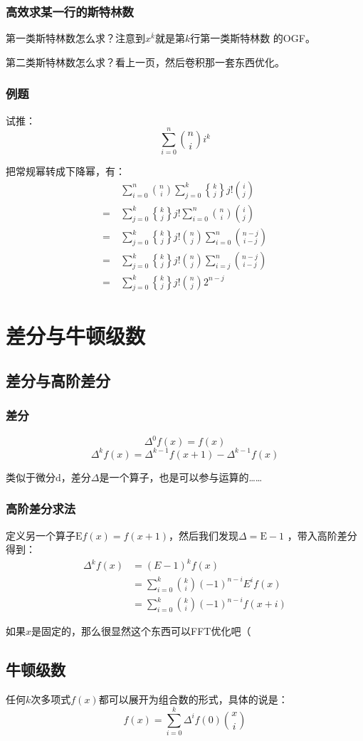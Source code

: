 \subsubsection{高效求某一行的斯特林数}
第一类斯特林数怎么求？注意到$x^{\overline k}$就是第$k$行第一类斯特林数
的OGF。\par
第二类斯特林数怎么求？看上一页，然后卷积那一套东西优化。
\subsubsection{例题}
试推：
\[\sum_{i = 0}^n\binom n i i^k\]\par
把常规幂转成下降幂，有：
\[
\begin{aligned}
\quad&\sum_{i = 0}^n\binom n i\sum_{j = 0}^k{k\brace j}j!\binom i j\\
=&\sum_{j = 0}^k{k\brace j}j!\sum_{i = 0}^n\binom n i\binom i j\\
=&\sum_{j = 0}^k{k\brace j}j!\binom n j\sum_{i = 0}^n\binom{n - j}{i - j}\\
=&\sum_{j = 0}^k{k\brace j}j!\binom n j\sum_{i = j}^n\binom{n - j}{i - j}\\
=&\sum_{j = 0}^k{k\brace j}j!\binom n j2^{n - j}
\end{aligned}
\]
\section{差分与牛顿级数}
\subsection{差分与高阶差分}
\subsubsection{差分}
\[\Delta^0f(x) = f(x)\]
\[\Delta^kf(x) = \Delta^{k - 1}f(x + 1) - \Delta^{k - 1}f(x)\]\par
类似于微分$\mathrm d$，差分$\Delta$是一个算子，也是可以参与运算的……
\subsubsection{高阶差分求法}
定义另一个算子$\mathrm Ef(x) = f(x + 1)$，然后我们发现$\Delta = \mathrm E - 1$
，带入高阶差分得到：
\[
\begin{aligned}
\Delta^kf(x) &= (E - 1)^kf(x)\\
&= \sum_{i = 0}^k\binom k i (-1)^{n - i}E^if(x)\\
&= \sum_{i = 0}^k\binom k i (-1)^{n - i}f(x + i)
\end{aligned}
\]\par
如果$x$是固定的，那么很显然这个东西可以FFT优化吧（
\subsection{牛顿级数}
任何$k$次多项式$f(x)$都可以展开为组合数的形式，具体的说是：
\[f(x) = \sum_{i = 0}^k\Delta^if(0)\binom x i\]